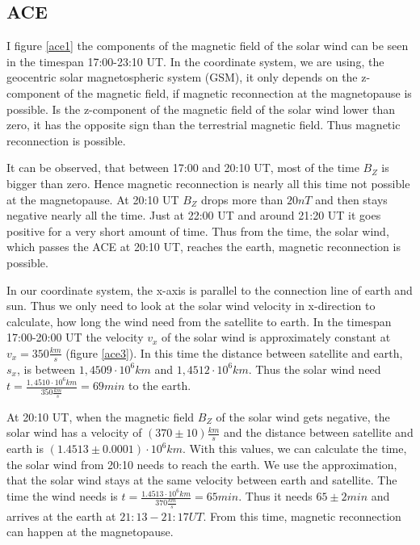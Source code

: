 \documentclass[10pt,a4paper]{article}
\begin{document}
\subsection{ACE}

I figure \ref{ace1} the components of the magnetic field of the solar wind can be seen in the timespan 17:00-23:10 UT. In the coordinate system, we are using, the geocentric solar magnetospheric system (GSM), it only depends on the z-component of the magnetic field, if magnetic reconnection at the magnetopause is possible. Is the z-component of the magnetic field of the solar wind lower than zero, it has the opposite sign than the terrestrial magnetic field. Thus magnetic reconnection is possible. 

It can be observed, that between 17:00 and 20:10 UT, most of the time $B_Z$ is bigger than zero. Hence magnetic reconnection is nearly all this time not possible at the magnetopause.
At 20:10 UT $B_Z$ drops more than $20 nT$ and then stays negative nearly all the time. Just at 22:00 UT and around 21:20 UT it goes positive for a very short amount of time. Thus from the time, the solar wind, which passes the ACE at 20:10 UT, reaches the earth, magnetic reconnection is possible. 

In our coordinate system, the x-axis is parallel to the connection line of earth and sun. Thus we only need to look at the solar wind velocity in x-direction to calculate, how long the wind need from the satellite to earth.
In the timespan 17:00-20:00 UT the velocity $v_x$ of the solar wind is approximately constant at $v_x = 350 \frac{km}{s}$ (figure \ref{ace3}). In this time the distance between satellite and earth, $s_x$, is between $1,4509 \cdot 10^6 km$ and $1,4512 \cdot 10^6 km$. Thus the solar wind need $t = \frac{1,4510 \cdot 10^6 km}{350 \frac{km}{s}} = 69 min$ to the earth.

At 20:10 UT, when the magnetic field $B_Z$ of the solar wind gets negative, the solar wind has a velocity of $(370 \pm 10) \frac{km}{s}$ and the distance between satellite and earth is $(1.4513 \pm 0.0001) \cdot 10^6 km$. With this values, we can calculate the time, the solar wind from 20:10 needs to reach the earth. We use the approximation, that the solar wind stays at the same velocity between earth and satellite. The time the wind needs is $t = \frac{1.4513 \cdot 10^6 km}{370 \frac{km}{s}} = 65 min$. Thus it needs $65 \pm 2 min$ and arrives at the earth at $21:13 - 21:17 UT$. From this time, magnetic reconnection can happen at the magnetopause.
\end{document}
